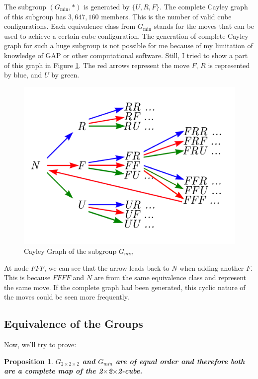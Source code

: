 \documentclass[12pt,a4paper]{article}
\theoremstyle{custom}
\newtheorem*{proposition}{Proposition}
\newcommand{\Gtwo}{\ensuremath{G_{2\times 2\times 2}}}
\newcommand{\Ttwo}{2$\times$2$\times$2-}
\begin{document}
The subgroup $\left(G_\text{min}, \scriptstyle* \right)$ is generated by $\{U, R, F\}$. The complete Cayley graph of this subgroup has $3,647,160$ members. This is the number of valid cube configurations. Each equivalence class from $G_\text{min}$ stands for the moves that can be used to achieve a certain cube configuration. The generation of complete Cayley graph for such a huge subgroup is not possible for me because of my limitation of knowledge of GAP or other computational software. Still, I tried to show a part of this graph in Figure \ref{figure_Cayleygraph_min}. The red arrows represent the move $F$, $R$ is represented by blue, and $U$ by green.

\begin{figure}[H]
\centering
\includegraphics[scale=0.9]{Cayleygraph_URF.png}
\caption{Cayley Graph of the subgroup $G_{min}$}
\label{figure_Cayleygraph_min}
\end{figure}

At node $FFF$, we can see that the arrow leads back to $N$ when adding another $F$. This is because $FFFF$ and $N$ are from the same equivalence class and represent the same move. If the complete graph had been generated, this cyclic nature of the moves could be seen more frequently.
\newpage
\subsection{Equivalence of the Groups}

Now, we'll try to prove: 
\begin{proposition}
    

\textbf{$\Gtwo$ and $G_{min}$ are of equal order and therefore both are a complete map of the \Ttwo cube.}
\end{proposition}
\end{document}
